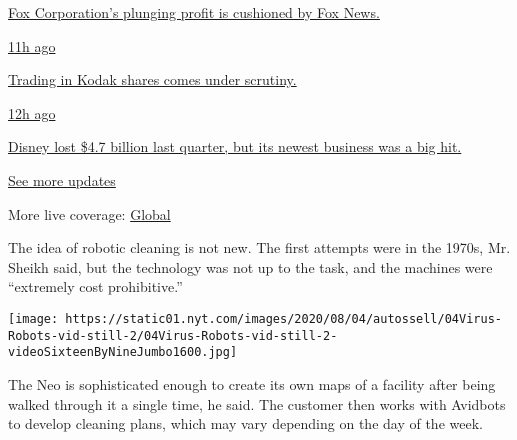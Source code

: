 \href{https://www.nytimes.com/live/2020/08/04/business/stock-market-today-coronavirus?action=click\&pgtype=Article\&state=default\&region=MAIN_CONTENT_1\&context=storylines_live_updates\#fox-corporations-plunging-profit-is-cushioned-by-fox-news}{Fox
Corporation's plunging profit is cushioned by Fox News.}

\href{https://www.nytimes.com/live/2020/08/04/business/stock-market-today-coronavirus?action=click\&pgtype=Article\&state=default\&region=MAIN_CONTENT_1\&context=storylines_live_updates\#trading-in-kodak-shares-comes-under-scrutiny}{11h
ago}

\href{https://www.nytimes.com/live/2020/08/04/business/stock-market-today-coronavirus?action=click\&pgtype=Article\&state=default\&region=MAIN_CONTENT_1\&context=storylines_live_updates\#trading-in-kodak-shares-comes-under-scrutiny}{Trading
in Kodak shares comes under scrutiny.}

\href{https://www.nytimes.com/live/2020/08/04/business/stock-market-today-coronavirus?action=click\&pgtype=Article\&state=default\&region=MAIN_CONTENT_1\&context=storylines_live_updates\#disney-lost-4-7-billion-last-quarter-but-its-newest-business-was-a-big-hit}{12h
ago}

\href{https://www.nytimes.com/live/2020/08/04/business/stock-market-today-coronavirus?action=click\&pgtype=Article\&state=default\&region=MAIN_CONTENT_1\&context=storylines_live_updates\#disney-lost-4-7-billion-last-quarter-but-its-newest-business-was-a-big-hit}{Disney
lost \$4.7 billion last quarter, but its newest business was a big hit.}

\href{https://www.nytimes.com/live/2020/08/04/business/stock-market-today-coronavirus?action=click\&pgtype=Article\&state=default\&region=MAIN_CONTENT_1\&context=storylines_live_updates}{See
more updates}

More live coverage:
\href{https://www.nytimes.com/2020/08/04/world/coronavirus-cases.html?action=click\&pgtype=Article\&state=default\&region=MAIN_CONTENT_1\&context=storylines_live_updates}{Global}

The idea of robotic cleaning is not new. The first attempts were in the
1970s, Mr. Sheikh said, but the technology was not up to the task, and
the machines were ``extremely cost prohibitive.''

\texttt{[image: https://static01.nyt.com/images/2020/08/04/autossell/04Virus-Robots-vid-still-2/04Virus-Robots-vid-still-2-videoSixteenByNineJumbo1600.jpg]}

The Neo is sophisticated enough to create its own maps of a facility
after being walked through it a single time, he said. The customer then
works with Avidbots to develop cleaning plans, which may vary depending
on the day of the week.

